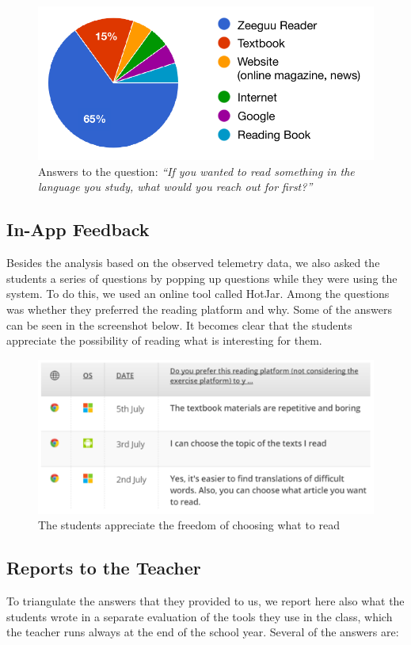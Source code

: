  \begin{figure}[h!]
    \centering
      \includegraphics[width=0.8\columnwidth]{figures/opinions/reader_vs_textbook}
      \caption{Answers to the question: {\em ``If you wanted to read something in the language you study, what would you reach out for first?''}}
      \label{fig:preferred_reader}
    \end{figure}



\subsection{In-App Feedback}
Besides the analysis  based on the observed telemetry data, we also asked the students a series of questions by popping up questions while they were using the system. To do this, we used an online tool called HotJar. Among the questions was whether they preferred the reading platform and why. Some of the answers can be seen in the screenshot below. It becomes clear that the students appreciate the possibility of reading what is interesting for them.

    \begin{figure}[h!]
    \centering
      \includegraphics[width=0.9\columnwidth]{figures/opinion_on_reading_platform}
      \caption{The students appreciate the freedom of choosing what to read}
    \end{figure}


\subsection{Reports to the Teacher}
To triangulate the answers that they provided to us, we report here also what the students wrote in a separate evaluation of the tools they use in the class, which the teacher runs always at the end of the school year. Several of the answers are: 

